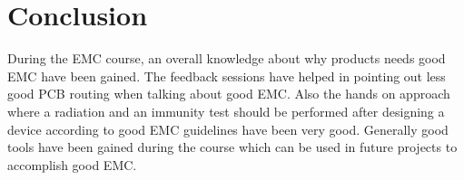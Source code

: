 \chapter{Conclusion}
During the EMC course, an overall knowledge about why products needs good EMC have been gained. The feedback sessions have helped in pointing out less good PCB routing when talking about good EMC. Also the hands on approach where a radiation and an immunity test should be performed after designing a device according to good EMC guidelines have been very good. 
\p Generally good tools have been gained during the course which can be used in future projects to accomplish good EMC.